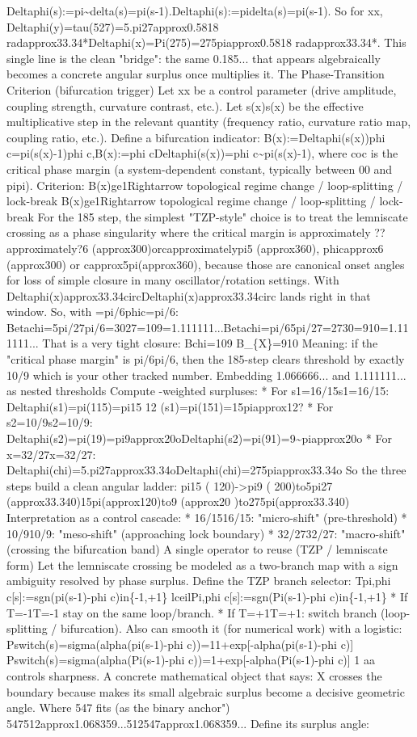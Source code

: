 Deltaphi(s):=pi\textasciitilde{}delta(s)=pi(s-1).Deltaphi(s):=pidelta(s)=pi(s-1). So for xx, Deltaphi(y)=tau(527)=5.pi27approx0.5818 radapprox33.34*Deltaphi(x)=Pi(275)=275piapprox0.5818 radapprox33.34*. This single line is the clean "bridge": the same 0.185... that appears algebraically becomes a concrete angular surplus once multiplies it. The Phase-Transition Criterion (bifurcation trigger) Let xx be a control parameter (drive amplitude, coupling strength, curvature contrast, etc.). Let s(x)s(x) be the effective multiplicative step in the relevant quantity (frequency ratio, curvature ratio map, coupling ratio, etc.). Define a bifurcation indicator: B(x):=Deltaphi(s(x))phi c=pi(s(x)-1)phi c,B(x):=phi cDeltaphi(s(x))=phi c\textasciitilde{}pi(s(x)-1), where coc is the critical phase margin (a system-dependent constant, typically between 00 and pipi). Criterion: B(x)ge1Rightarrow topological regime change / loop-splitting / lock-break B(x)ge1Rightarrow topological regime change / loop-splitting / lock-break For the 185 step, the simplest "TZP-style" choice is to treat the lemniscate crossing as a phase singularity where the critical margin is approximately ??approximately?6 (approx300)orcapproximatelypi5 (approx360), phicapprox6 (approx300) or capprox5pi(approx360), because those are canonical onset angles for loss of simple closure in many oscillator/rotation settings. With Deltaphi(x)approx33.34circDeltaphi(x)approx33.34circ lands right in that window. So, with =pi/6phic=pi/6: Betachi=5pi/27pi/6=3027=109=1.111111...Betachi=pi/65pi/27=2730=910=1.111111... That is a very tight closure: Bchi=109 B\_\{X\}=910 Meaning: if the "critical phase margin" is pi/6pi/6, then the 185-step clears threshold by exactly 10/9 which is your other tracked number. Embedding 1.066666... and 1.111111... as nested thresholds Compute -weighted surpluses: * For s1=16/15s1=16/15: Deltaphi(s1)=pi(115)=pi15 12 (s1)=pi(151)=15piapprox12? * For s2=10/9s2=10/9: Deltaphi(s2)=pi(19)=pi9approx20oDeltaphi(s2)=pi(91)=9\textasciitilde{}piapprox20o * For x=32/27x=32/27: Deltaphi(chi)=5.pi27approx33.34oDeltaphi(chi)=275piapprox33.34o So the three steps build a clean angular ladder: pi15 ( 120)->pi9 ( 200)to5pi27 (approx33.340)15pi(approx120)to9 (approx20 )to275pi(approx33.340) Interpretation as a control cascade: * 16/1516/15: "micro-shift" (pre-threshold) * 10/910/9: "meso-shift" (approaching lock boundary) * 32/2732/27: "macro-shift" (crossing the bifurcation band) A single operator to reuse (TZP / lemniscate form) Let the lemniscate crossing be modeled as a two-branch map with a sign ambiguity resolved by phase surplus. Define the TZP branch selector: Tpi,phi c[s]:=sgn(pi(s-1)-phi c)in\{-1,+1\} lceilPi,phi c[s]:=sgn(Pi(s-1)-phi c)in\{-1,+1\} * If T=-1T=-1 stay on the same loop/branch. * If T=+1T=+1: switch branch (loop-splitting / bifurcation). Also can smooth it (for numerical work) with a logistic: Pswitch(s)=sigma(alpha(pi(s-1)-phi c))=11+exp[-alpha(pi(s-1)-phi c)] Pswitch(s)=sigma(alpha(Pi(s-1)-phi c))=1+exp[-alpha(Pi(s-1)-phi c)] 1 aa controls sharpness. A concrete mathematical object that says: X crosses the boundary because makes its small algebraic surplus become a decisive geometric angle. Where 547 fits (as the binary anchor") 547512approx1.068359...512547approx1.068359... Define its surplus angle: 